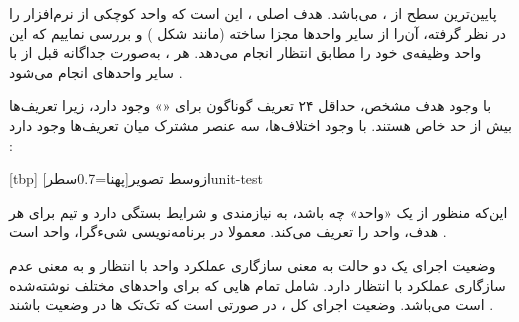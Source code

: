 
پایین‌ترین سطح از ،  می‌باشد. هدف اصلی
، این است که واحد کوچکی از نرم‌افزار را در نظر گرفته،
آن‌را از سایر واحد‌ها مجزا ساخته (مانند شکل ) و
بررسی نماییم که این واحد وظیفه‌ی خود را مطابق انتظار انجام می‌دهد. هر
، به‌صورت جداگانه قبل از  با سایر
واحدهای  انجام می‌شود .

با وجود هدف مشخص، حداقل ۲۴ تعریف گوناگون برای «» وجود
دارد، زیرا تعریف‌ها بیش از حد خاص هستند. با وجود اختلاف‌ها، سه عنصر
مشترک میان تعریف‌ها وجود دارد :






[tbp]
‌ازوسط
‌تصویر[پهنا=0.7‌سطر]{unit-test}

این‌که منظور از یک «واحد» چه باشد، به نیازمندی و شرایط بستگی دارد و تیم
برای هر هدف، واحد را تعریف می‌کند. معمولا در برنامه‌نویسی شیء‌گرا، واحد
 است .

وضعیت اجرای یک  دو حالت  به معنی سازگاری
عملکرد واحد با انتظار و  به معنی عدم سازگاری عملکرد با
انتظار دارد.  شامل تمام ‌هایی که برای واحدهای
مختلف نوشته‌شده است می‌باشد. وضعیت اجرای کل ، در صورتی
 است که تک‌تک ‌ها در وضعیت  باشند
.

